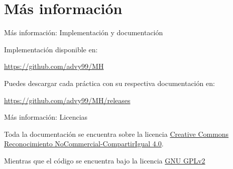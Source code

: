 \documentclass{beamer}
\begin{document}
\section{Más información}
  
\begin{frame}{Más información: Implementación y documentación}

	Implementación disponible en: 
	
	\begin{center}
		\url{https://github.com/advy99/MH}	
	\end{center}
	
	Puedes descargar cada práctica con su respectiva documentación en:
	
	\begin{center}
		\url{https://github.com/advy99/MH/releases}	
	\end{center}

	
\end{frame}	  
  
\begin{frame}{Más información: Licencias}
  
	Toda la documentación se encuentra sobre la licencia
 	\href{https://creativecommons.org/licenses/by-nc-sa/4.0/deed.es}{Creative Commons
	Reconocimiento NoCommercial-CompartirIgual 4.0}.

	\begin{center}\ccbyncsa\end{center}

	\vspace{1cm}

	Mientras que el código se encuentra bajo la licencia \href{https://www.gnu.org/licenses/old-licenses/gpl-2.0.html}{GNU GPLv2}
  
\end{frame}
\end{document}
